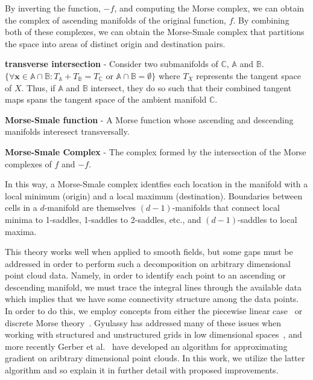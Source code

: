 By inverting the function, $-f$, and computing the Morse complex, we can obtain the complex of ascending manifolds of the original function, $f$.
%
By combining both of these complexes, we can obtain the Morse-Smale complex that partitions the space into areas of distinct origin and destination pairs.


\begin{defn}
\textbf{transverse intersection} - Consider two submanifolds of $\mathbb{C}$, $\mathbb{A}$ and $\mathbb{B}$. $\{\forall \mathbf{x} \in \mathbb{A} \cap \mathbb{B}: T_{\mathbb{A}} + T_{\mathbb{B}} = T_{\mathbb{C}} \text{ or } \mathbb{A} \cap \mathbb{B} = \emptyset\}$ where $T_{X}$ represents the tangent space of $X$.
%
Thus, if $\mathbb{A}$ and $\mathbb{B}$ intersect, they do so such that their combined tangent maps spans the tangent space of the ambient manifold $\mathbb{C}$.
\end{defn}

\begin{defn}
\textbf{Morse-Smale function} - A Morse function whose ascending and descending manifolds interesect transversally.
\end{defn}

\begin{defn}
\textbf{Morse-Smale Complex} - The complex formed by the intersection of the Morse complexes of $f$ and $-f$.
\end{defn}

In this way, a Morse-Smale complex identfies each location in the manifold with a local minimum (origin) and a local maximum (destination).
%
Boundaries between cells in a $d$-manifold are themselves $(d-1)$-manifolds that connect local minima to 1-saddles, 1-saddles to 2-saddles, etc., and $(d-1)$-saddles to local maxima.


This theory works well when applied to smooth fields, but some gaps must be addressed in order to perform such a decomposition on arbitrary dimensional point cloud data.
%
Namely, in order to identify each point to an ascending or descending manifold, we must trace the integral lines through the available data which implies that we have some connectivity structure among the data points.
%
In order to do this, we employ concepts from either the piecewise linear case~\cite{EdelsbrunnerLetscherZomorodian2002} or discrete Morse theory~\cite{Forman2002}.
%
Gyulassy has addressed many of these issues when working with structured and unstructured grids in low dimensional spaces~\cite{Gyulassy2008}, and more recently Gerber et al.~\cite{GerberBremerPascucci2010} have developed an algorithm for approximating gradient on aribtrary dimensional point clouds.
%
In this work, we utilize the latter algorithm and so explain it in further detail with proposed improvements.

